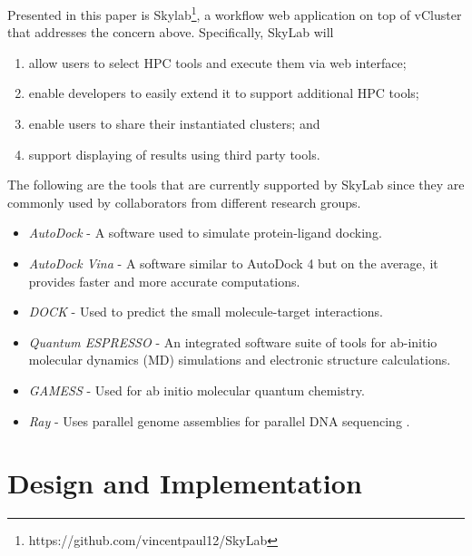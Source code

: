 Presented in this paper is Skylab\footnote{https://github.com/vincentpaul12/SkyLab}, a workflow web application on top of vCluster that addresses the concern above. Specifically, SkyLab will  

\begin{enumerate}
	\item allow users to select HPC tools and execute them via web interface; 
	\item enable developers to easily extend it to support additional HPC tools;
	\item enable users to share their instantiated clusters; and
	\item support displaying of results using third party tools.
\end{enumerate}
   
The following are the tools that are currently supported by SkyLab since they are commonly used by collaborators from different research groups.

\begin{itemize}
    	\item \textit{AutoDock} - A software used to simulate protein-ligand docking\cite{morris2009autodock4}.

        \item \textit{AutoDock Vina} - A software similar to AutoDock 4 but on the average, it provides faster and more accurate computations\cite{JCC:JCC21334}. 
            
		\item \textit{DOCK} - Used to predict the small molecule-target interactions\cite{lang2009dock}.
            
      	\item \textit{Quantum ESPRESSO} - An integrated software suite of tools for ab-initio molecular dynamics (MD) simulations and electronic structure calculations\cite{QE-2009}.

  		\item \textit{GAMESS} - Used for ab initio molecular quantum chemistry\cite{1993gamess}.
            
 	    \item \textit{Ray} - Uses parallel genome assemblies for parallel DNA sequencing \cite{boisvert_ray_2012}.

\end{itemize}   
      

        
\section{Design and Implementation}

